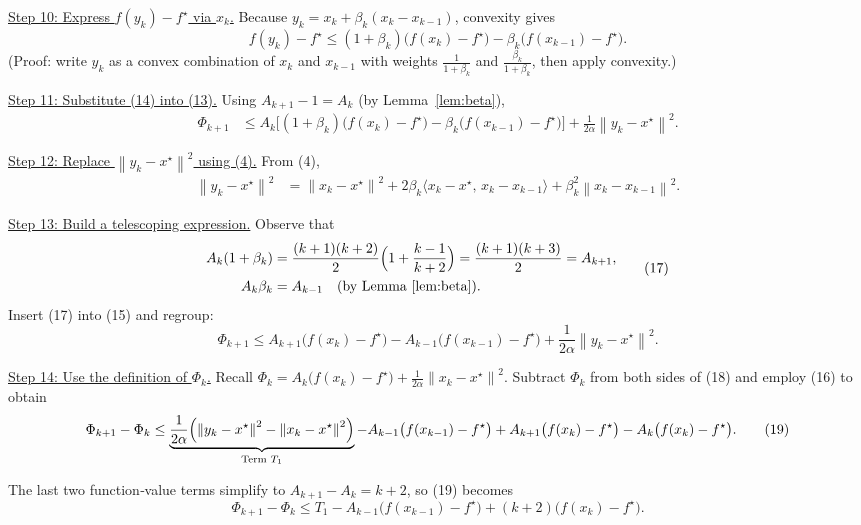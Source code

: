 \documentclass{article}
\newcommand{\norm}[1]{\left\|#1\right\|}
\begin{document}
\noindent\underline{Step 10: Express $f(y_k)-f^\star$ via $x_k$.}  
Because $y_k = x_k + \beta_k(x_k-x_{k-1})$, convexity gives
\[
f(y_k)-f^\star \le (1+\beta_k)\bigl(f(x_k)-f^\star\bigr)
               -\beta_k\bigl(f(x_{k-1})-f^\star\bigr) .
\tag{14}
\]
(Proof: write $y_k$ as a convex combination of $x_k$ and $x_{k-1}$ with
weights $\frac{1}{1+\beta_k}$ and $\frac{\beta_k}{1+\beta_k}$, then apply convexity.)

\noindent\underline{Step 11: Substitute (14) into (13).}  
Using $A_{k+1}-1 = A_k$ (by Lemma~\ref{lem:beta}),
\[
\begin{aligned}
\Phi_{k+1}
&\le A_k\!\bigl[(1+\beta_k)\bigl(f(x_k)-f^\star\bigr)
               -\beta_k\bigl(f(x_{k-1})-f^\star\bigr)\bigr]
   +\frac{1}{2\alpha}\norm{y_k-x^\star}^2 .
\end{aligned}
\tag{15}
\]

\noindent\underline{Step 12: Replace $\norm{y_k-x^\star}^2$ using (4).}  
From (4),
\[
\begin{aligned}
\norm{y_k-x^\star}^2
&= \norm{x_k-x^\star}^2
   +2\beta_k\langle x_k-x^\star,\,x_k-x_{k-1}\rangle
   +\beta_k^{2}\norm{x_k-x_{k-1}}^2 .
\end{aligned}
\tag{16}
\]

\noindent\underline{Step 13: Build a telescoping expression.}  
Observe that
\[
\begin{aligned}
A_k(1+\beta_k) &= \frac{(k+1)(k+2)}{2}\Bigl(1+\frac{k-1}{k+2}\Bigr)
               = \frac{(k+1)(k+3)}{2}=A_{k+1},\\
A_k\beta_k &= A_{k-1}\quad\text{(by Lemma~\ref{lem:beta})}.
\end{aligned}
\tag{17}
\]
Insert (17) into (15) and regroup:
\[
\Phi_{k+1}\le
A_{k+1}\bigl(f(x_k)-f^\star\bigr)
- A_{k-1}\bigl(f(x_{k-1})-f^\star\bigr)
+\frac{1}{2\alpha}\norm{y_k-x^\star}^2 .
\tag{18}
\]

\noindent\underline{Step 14: Use the definition of $\Phi_k$.}  
Recall $\Phi_k = A_k\bigl(f(x_k)-f^\star\bigr)+\frac{1}{2\alpha}\norm{x_k-x^\star}^2$.
Subtract $\Phi_k$ from both sides of (18) and employ (16) to obtain
\[
\Phi_{k+1}-\Phi_k
\le
\underbrace{\frac{1}{2\alpha}\Bigl(\norm{y_k-x^\star}^2-\norm{x_k-x^\star}^2\Bigr)}_{\text{Term~$T_1$}}
-
A_{k-1}\bigl(f(x_{k-1})-f^\star\bigr)
+ A_{k+1}\bigl(f(x_k)-f^\star\bigr)-A_k\bigl(f(x_k)-f^\star\bigr).
\tag{19}
\]

The last two function‑value terms simplify to $A_{k+1}-A_k = k+2$,
so (19) becomes
\[
\Phi_{k+1}-\Phi_k \le T_1 -A_{k-1}\bigl(f(x_{k-1})-f^\star\bigr)+(k+2)\bigl(f(x_k)-f^\star\bigr).
\tag{20}
\]
\end{document}
